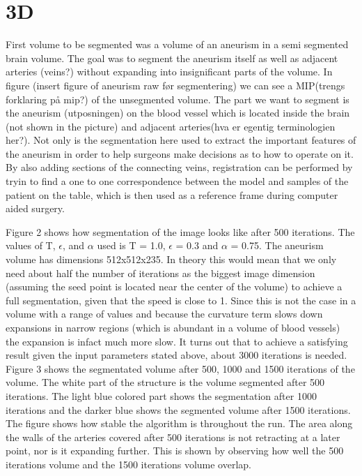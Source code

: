 \section{3D}
First volume to be segmented  was a volume of an aneurism in a semi segmented brain volume. 
The goal was to segment the aneurism itself as well as adjacent arteries (veins?) without expanding into insignificant parts of the volume. In figure (insert figure of aneurism raw før segmentering) we can see a MIP(trengs forklaring på mip?) of the unsegmented volume. The part we want to segment is the aneurism (utposningen) on the blood vessel which is located inside the brain (not shown in the picture) and adjacent arteries(hva er egentig terminologien her?). Not only is the segmentation here used to extract the important features of the aneurism in order to help surgeons make decisions as to how to operate on it. By also adding sections of the connecting veins, registration can be performed by tryin to find a one to one correspondence between the model and samples of the patient on the table, which is then used as a reference frame during computer aided surgery. 

Figure 2 shows how segmentation of the image looks like after 500 iterations. The values of T, $\epsilon$, and $\alpha$ used is T = 1.0, $\epsilon$ = 0.3 and $\alpha$ = 0.75. The aneurism volume has dimensions 512x512x235. In theory this would mean that we only need about half the number of iterations as the biggest image dimension (assuming the seed point is located near the center of the volume) to achieve a full segmentation, given that the speed is close to 1. Since this is not the case in a volume with a range of values and because the curvature term slows down expansions in narrow regions (which is abundant in a volume of blood vessels) the expansion is infact much more slow. It turns out that to achieve a satisfying result given the input parameters stated above, about 3000 iterations is needed. Figure 3 shows the segmentated volume after 500, 1000 and 1500 iterations of the volume. The white part of the structure is the volume segmented after 500 iterations. The light blue colored part shows the segmentation after 1000 iterations and the darker blue shows the segmented volume after 1500 iterations. The figure shows how stable the algorithm is throughout the run. The area along the walls of the arteries covered after 500 iterations is not retracting at a later point, nor is it expanding further. This is shown by observing how well the 500 iterations volume and the 1500 iterations volume overlap.

